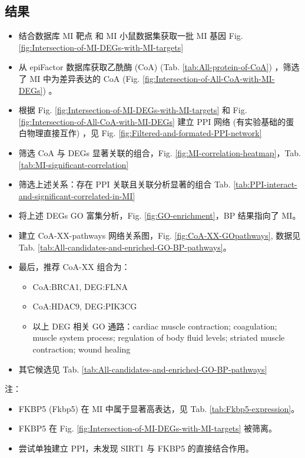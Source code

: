 \documentclass[
]{article}
\providecommand{\tightlist}{%
  \setlength{\itemsep}{0pt}\setlength{\parskip}{0pt}}
\begin{document}
\hypertarget{ux7ed3ux679c}{%
\subsection{结果}\label{ux7ed3ux679c}}

\begin{itemize}
\tightlist
\item
  结合数据库 MI 靶点 和 MI 小鼠数据集获取一批 MI 基因 Fig. \ref{fig:Intersection-of-MI-DEGs-with-MI-targets}
\item
  从 epiFactor 数据库获取乙酰酶 (CoA) (Tab. \ref{tab:All-protein-of-CoA}) ，筛选了 MI 中为差异表达的 CoA (Fig. \ref{fig:Intersection-of-All-CoA-with-MI-DEGs}) 。
\item
  根据 Fig. \ref{fig:Intersection-of-MI-DEGs-with-MI-targets}
  和 Fig. \ref{fig:Intersection-of-All-CoA-with-MI-DEGs}
  建立 PPI 网络 (有实验基础的蛋白物理直接互作) ，见 Fig. \ref{fig:Filtered-and-formated-PPI-network}
\item
  筛选 CoA 与 DEGs 显著关联的组合，Fig. \ref{fig:MI-correlation-heatmap}，Tab. \ref{tab:MI-significant-correlation}
\item
  筛选上述关系：存在 PPI 关联且关联分析显著的组合 Tab. \ref{tab:PPI-interact-and-significant-correlated-in-MI}
\item
  将上述 DEGs GO 富集分析，Fig. \ref{fig:GO-enrichment}，BP 结果指向了 MI。
\item
  建立 CoA-XX-pathways 网络关系图，Fig. \ref{fig:CoA-XX-GOpathways},
  数据见 Tab. \ref{tab:All-candidates-and-enriched-GO-BP-pathways}。
\item
  最后，推荐 CoA-XX 组合为：

  \begin{itemize}
  \tightlist
  \item
    CoA:BRCA1, DEG:FLNA
  \item
    CoA:HDAC9, DEG:PIK3CG
  \item
    以上 DEG 相关 GO 通路：cardiac muscle contraction; coagulation; muscle system process; regulation of body fluid levels; striated muscle contraction; wound healing
  \end{itemize}
\item
  其它候选见 Tab. \ref{tab:All-candidates-and-enriched-GO-BP-pathways}
\end{itemize}

注：

\begin{itemize}
\tightlist
\item
  FKBP5 (Fkbp5) 在 MI 中属于显著高表达，见 Tab. \ref{tab:Fkbp5-expression}。
\item
  FKBP5 在 Fig. \ref{fig:Intersection-of-MI-DEGs-with-MI-targets} 被筛离。
\item
  尝试单独建立 PPI，未发现 SIRT1 与 FKBP5 的直接结合作用。
\end{itemize}
\end{document}
